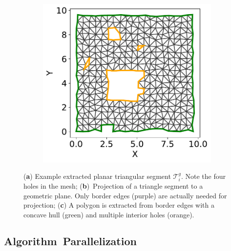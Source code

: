 \begin{figure}[H]
\begin{subfigure}[t]{.30\linewidth}
    \caption{\label{fig:ch3_polygon_extraction_b}}
  \end{subfigure}
  \hfill
  \begin{subfigure}[t]{.30\linewidth}
    \centering\includegraphics[clip,trim=0cm 0cm 0cm 0cm,width=.99\linewidth]{chapter_3_polylidar3d/imgs/polygon/PolygonExtraction_b2.pdf}
    \caption{\label{fig:ch3_polygon_extraction_c}}
  \end{subfigure}
  \caption[Example polygon extraction from a planar triangular segment]{(\textbf{a}) Example extracted planar triangular segment $\mathcal{T}^{g}_i$. Note the four holes in the mesh; (\textbf{b})~Projection of a triangle segment to a geometric plane. Only border edges (purple) are actually needed for projection; (\textbf{c}) A polygon is extracted from border edges with a concave hull (green) and multiple interior holes (orange). }\label{fig:ch3_polygon_extraction}
\end{figure}



\subsection{Algorithm~Parallelization}\label{sec:ch3_methods_polylidar_parallel}

